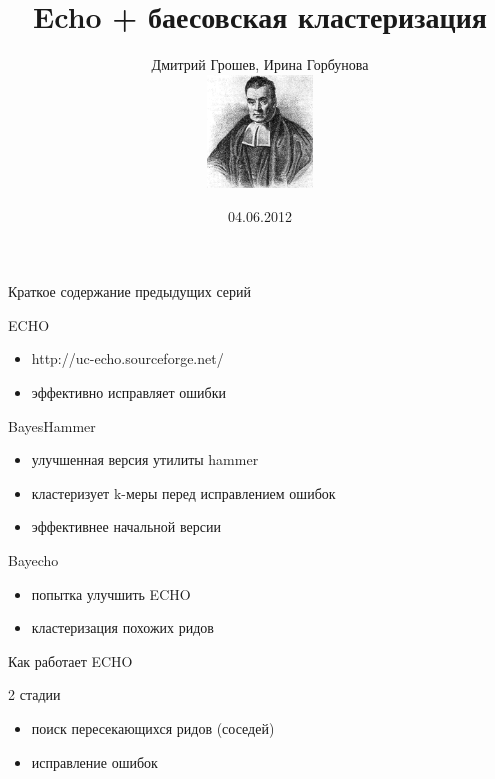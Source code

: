 \documentclass[10pt]{beamer}
\title[Bayecho]{Echo + баесовская кластеризация}
\author{Дмитрий Грошев, Ирина Горбунова\\
  \includegraphics[height=3cm]{thomas_bayes.png}}
\date{04.06.2012}
\institute{СПбАУ}
\begin{document}
\renewcommand*{\inserttotalframenumber}{\pageref{lastframe}}
\begin{frame}
\titlepage
\end{frame}


\begin{frame}
  \begin{center}
    \Large
    Краткое содержание предыдущих серий
  \end{center}
\end{frame}

\begin{frame}{ECHO}
  \begin{itemize}
  \item http://uc-echo.sourceforge.net/
  \item эффективно исправляет ошибки
  \end{itemize}
\end{frame}

\begin{frame}{BayesHammer}
  \begin{itemize}
  \item улучшенная версия утилиты hammer
  \item кластеризует k-меры перед исправлением ошибок
  \item эффективнее начальной версии
  \end{itemize}
\end{frame}

\begin{frame}{Bayecho}
  \begin{itemize}
  \item попытка улучшить ECHO
  \item кластеризация похожих ридов
  \end{itemize}
\end{frame}


\begin{frame}
  \begin{center}
    \Large
    Как работает ECHO
  \end{center}
\end{frame}

\begin{frame}{2 стадии}
  \begin{itemize}
  \item поиск пересекающихся ридов (соседей)
  \item исправление ошибок
  \end{itemize}
\end{frame}
\end{document}
